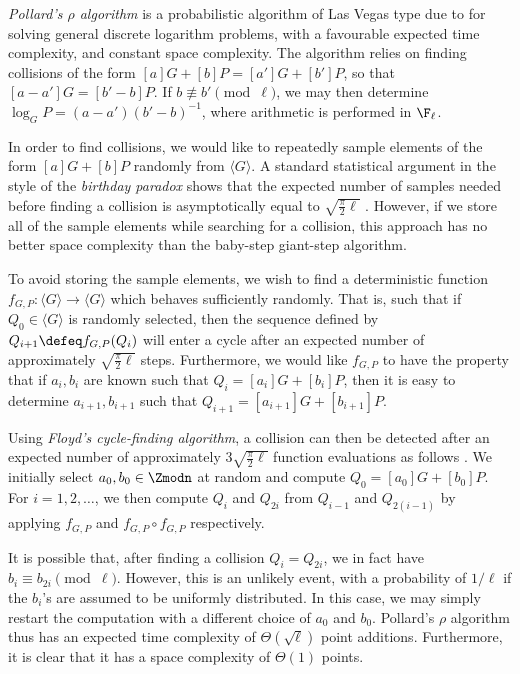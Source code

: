 
\emph{Pollard's $\rho$ algorithm} is a probabilistic algorithm of Las Vegas type due to \citep{Pollard} for solving general discrete logarithm problems, with a favourable expected time complexity, and constant space complexity. The algorithm relies on finding collisions of the form $[a]G + [b]P = [a']G + [b']P$, so that $[a - a'] G = [b' - b] P$. If $b \not\equiv b' \pmod{\ell}$, we may then determine $\log_G P = (a - a') (b' - b)^{-1}$, where arithmetic is performed in $\F_\ell$.

In order to find collisions, we would like to repeatedly sample elements of the form $[a]G + [b]P$ randomly from $\langle G \rangle$. A standard statistical argument in the style of the \emph{birthday paradox} shows that the expected number of samples needed before finding a collision is asymptotically equal to $\sqrt{\frac{\pi}{2} \ell}$ \citep{Galbraith}. However, if we store all of the sample elements while searching for a collision, this approach has no better space complexity than the baby-step giant-step algorithm.

To avoid storing the sample elements, we wish to find a deterministic function $f_{G, P} : \langle G \rangle \to \langle G \rangle$ which behaves sufficiently randomly. That is, such that if $Q_0 \in \langle G \rangle$ is randomly selected, then the sequence defined by $Q_{i+1} \defeq f_{G, P}(Q_i)$ will enter a cycle after an expected number of approximately $\sqrt{\frac{\pi}{2} \ell}$ steps. Furthermore, we would like $f_{G, P}$ to have the property that if $a_i, b_i$ are known such that $Q_i = [a_i]G + [b_i]P$, then it is easy to determine $a_{i+1}, b_{i+1}$ such that $Q_{i+1} = [a_{i+1}]G + [b_{i+1}]P$.

Using \emph{Floyd's cycle-finding algorithm}, a collision can then be detected after an expected number of approximately $3 \sqrt{\frac{\pi}{2} \ell}$ function evaluations as follows \citep{Floyd}. We initially select $a_0, b_0 \in \Zmodn$ at random and compute $Q_0 = [a_0] G + [b_0] P$. For $i = 1, 2, \ldots$, we then compute $Q_i$ and $Q_{2i}$ from $Q_{i-1}$ and $Q_{2(i-1)}$ by applying $f_{G, P}$ and $f_{G, P} \circ f_{G, P}$ respectively.

It is possible that, after finding a collision $Q_i = Q_{2i}$, we in fact have $b_i \equiv b_{2i} \pmod{\ell}$. However, this is an unlikely event, with a probability of $1 / \ell$ if the $b_i$'s are assumed to be uniformly distributed. In this case, we may simply restart the computation with a different choice of $a_0$ and $b_0$. Pollard's $\rho$ algorithm thus has an expected time complexity of $\Theta(\sqrt{\ell})$ point additions. Furthermore, it is clear that it has a space complexity of $\Theta(1)$ points.

